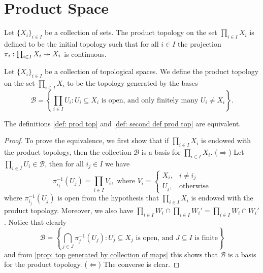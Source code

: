 \section{Product Space}

\begin{definition}
  \label{def: prod top}
  Let \(\{X_i\}_{i \in I}\) be a collection of sets. The product topology on the
  set \(\prod_{i \in I} X_i\) is defined to be the initial topology such that
  for all \(i \in I\) the projection \(\pi_i : \prod_{i \in I} X_i \twoheadrightarrow X_i\) is
  continuous.
\end{definition}

\begin{definition}
  \label{def: second def prod top}
  Let \(\{X_i\}_{i \in I}\) be a collection of topological spaces. We
  define the product topology on the set \(\prod_{i \in I} X_i\) to be the
  topology generated by the bases
  \[
    \mathcal B = \left\{ \prod_{i \in I} U_i \colon U_i \subseteq X_i
    \text{ is open, and only finitely many } U_i \neq X_i \right\}.
  \]
\end{definition}

\begin{corollary}\label{cor: equivalent defs prod top}
  The definitions \ref{def: prod top} and \ref{def: second def prod top}
  are equivalent.
\end{corollary}

\begin{proof}
  To prove the equivalence, we first show that if \(\prod_{i \in I} X_i\) is
  endowed with the product topology, then the collection \(\mathcal B\) is a
  basis for \(\prod_{i \in I} X_i\). (\(\Rightarrow\)) Let \(\prod_{i \in I} U_i
  \in \mathcal B\), then for all \(i_j \in I\) we have
  \[
    \pi_{i_j}^{-1}(U_j) = \prod_{i \in I} V_i, \text{ where } V_i =
    \begin{cases}
      X_i, &i \neq i_j \\
      U_j, &\text{otherwise}
    \end{cases}
  \]
  where \(\pi_{i_j}^{-1}(U_j)\) is open from the hypothesis that \(\prod_{i
  \in I} X_i\) is endowed with the product topology. Moreover, we also have
  \(\prod_{i \in I} W_i \cap \prod_{i \in I} W_i' = \prod_{i \in I} W_i \cap
  W_i'\). Notice that clearly
  \[
    \mathcal B = \left\{ \bigcap_{j \in J} \pi_j^{-1}(U_j) \colon U_j \subseteq X_j
    \text{ is open, and } J \subseteq I \text{ is finite}\right\}
  \]
  and from \cref{prop: top generated by collection of maps} this shows that
  \(\mathcal B\) is a basis for the product topology. (\(\Leftarrow\)) The
  converse is clear.
\end{proof}

